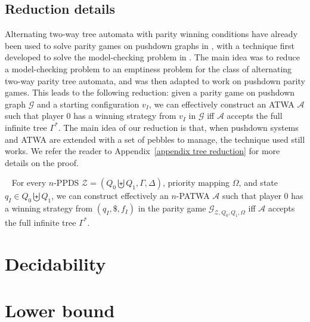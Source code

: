 \documentclass[a4paper,UKenglish,cleveref, autoref, thm-restate]{lipics-v2021}
\begin{document}
\subsection{Reduction details}


Alternating two-way tree automata with parity winning conditions have already been used to solve parity games on pushdown graphs in \cite{cachat2002two}, with a technique first developed to solve the model-checking problem in \cite{kupferman2000automata}. The main
idea was to reduce a model-checking problem to an emptiness problem for the class of alternating two-way parity tree automata, and was then adapted to work on pushdown parity games.
%
%
This leads to the following reduction: given a 
parity game on pushdown graph $\mathcal{G}$ and a starting configuration $v_I$, we can
effectively construct an ATWA $\mathcal{A}$
such that
player $0$ has a winning strategy from $v_I$ in $\mathcal{G}$ iff $\mathcal{A}$ accepts the full
infinite tree $\Gamma^*$. The main idea of our reduction is that, when pushdown systems and ATWA are extended with a set of pebbles to manage, the technique used %
still works.
We refer the reader to Appendix~\ref{appendix tree reduction} for more details on the proof.




\begin{theorem}~\label{theorem reduction PATWA}
For every $n$-PPDS $\mathcal{Z} = (Q_0 \biguplus Q_1, \Gamma,\Delta)$, 
priority mapping $\Omega$, and state $q_I \in Q_0 \biguplus Q_1$,
we can construct 
effectively
an $n$-PATWA $\mathcal{A}$ 
such that
player $0$ has a winning strategy from $(q_I, \$, f_I)$ in the parity game 
$\mathcal{G}_{\mathcal{Z},Q_0,Q_1,\Omega}$
iff
$\mathcal{A}$ accepts the full infinite tree $\Gamma^*$.
\end{theorem}



\section{Decidability}\label{section decidability}








\section{Lower bound}
\end{document}
